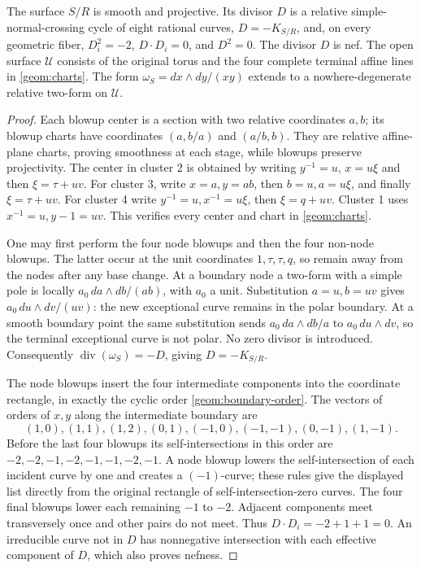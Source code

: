 \begin{proposition}\label{geom:surface}
The surface $S/R$ is smooth and projective.  Its divisor $D$ is a
relative simple-normal-crossing cycle of eight rational curves,
$D=-K_{S/R}$, and, on every geometric fiber,
$D_i^2=-2$, $D\cdot D_i=0$, and $D^2=0$.  The divisor $D$ is nef.
The open surface $\mathcal U$ consists of the original torus and the
four complete terminal affine lines in \eqref{geom:charts}.  The form
$\omega_S=dx\wedge dy/(xy)$ extends to a nowhere-degenerate relative
two-form on $\mathcal U$.
\end{proposition}

\begin{proof}
Each blowup center is a section with two relative coordinates $a,b$;
its blowup charts have coordinates $(a,b/a)$ and $(a/b,b)$.  They are
relative affine-plane charts, proving smoothness at each stage, while
blowups preserve projectivity.  The center in cluster 2 is obtained by
writing $y^{-1}=u$, $x=u\xi$ and then $\xi=\tau+uv$.
For cluster 3, write $x=a,y=ab$, then $b=u,a=u\xi$, and finally
$\xi=\tau+uv$.  For cluster 4 write $y^{-1}=u,x^{-1}=u\xi$, then
$\xi=q+uv$.  Cluster 1 uses $x^{-1}=u,y-1=uv$.
This verifies every center and chart in \eqref{geom:charts}.

One may first perform the four node blowups and then the four
non-node blowups.  The latter occur at the unit coordinates
$1,\tau,\tau,q$, so remain away from the nodes after any base change.
At a boundary node a two-form with a simple pole is locally
$a_0\,da\wedge db/(ab)$, with $a_0$ a unit.  Substitution
$a=u,b=uv$ gives $a_0\,du\wedge dv/(uv)$: the new exceptional
curve remains in the polar boundary.  At a smooth boundary point the
same substitution sends $a_0\,da\wedge db/a$ to
$a_0\,du\wedge dv$, so the terminal exceptional curve is not polar.
No zero divisor is introduced.  Consequently
$\operatorname{div}(\omega_S)=-D$, giving $D=-K_{S/R}$.

The node blowups insert the four intermediate components into the
coordinate rectangle, in exactly the cyclic order
\eqref{geom:boundary-order}.  The vectors of orders of $x,y$ along
the intermediate boundary are
\[
(1,0),(1,1),(1,2),(0,1),(-1,0),(-1,-1),(0,-1),(1,-1).
\]
Before the last four blowups its self-intersections in this order are
$-2,-2,-1,-2,-1,-1,-2,-1$.  A node blowup lowers the self-intersection
of each incident curve by one and creates a $(-1)$-curve; these rules
give the displayed list directly from the original rectangle of
self-intersection-zero curves.  The four final blowups lower each
remaining $-1$ to $-2$.  Adjacent components meet transversely once
and other pairs do not meet.  Thus $D\cdot D_i=-2+1+1=0$.
An irreducible curve not in $D$ has nonnegative intersection with
each effective component of $D$, which also proves nefness.


\end{proof}
